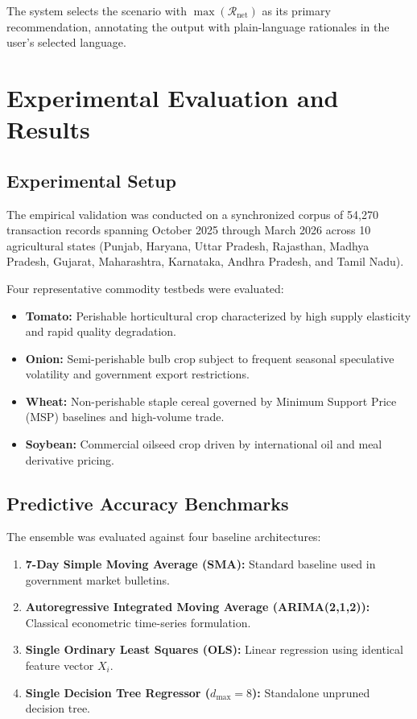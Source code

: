 \documentclass[conference]{IEEEtran}
\begin{document}
The system selects the scenario with $\max(\mathcal{R}_{\text{net}})$ as its primary recommendation, annotating the output with plain-language rationales in the user's selected language.

\section{Experimental Evaluation and Results}

\subsection{Experimental Setup}
The empirical validation was conducted on a synchronized corpus of 54,270 transaction records spanning October 2025 through March 2026 across 10 agricultural states (Punjab, Haryana, Uttar Pradesh, Rajasthan, Madhya Pradesh, Gujarat, Maharashtra, Karnataka, Andhra Pradesh, and Tamil Nadu). 

Four representative commodity testbeds were evaluated:
\begin{itemize}
    \item \textbf{Tomato:} Perishable horticultural crop characterized by high supply elasticity and rapid quality degradation.
    \item \textbf{Onion:} Semi-perishable bulb crop subject to frequent seasonal speculative volatility and government export restrictions.
    \item \textbf{Wheat:} Non-perishable staple cereal governed by Minimum Support Price (MSP) baselines and high-volume trade.
    \item \textbf{Soybean:} Commercial oilseed crop driven by international oil and meal derivative pricing.
\end{itemize}

\subsection{Predictive Accuracy Benchmarks}
The ensemble was evaluated against four baseline architectures:
\begin{enumerate}
    \item \textbf{7-Day Simple Moving Average (SMA):} Standard baseline used in government market bulletins.
    \item \textbf{Autoregressive Integrated Moving Average (ARIMA(2,1,2)):} Classical econometric time-series formulation.
    \item \textbf{Single Ordinary Least Squares (OLS):} Linear regression using identical feature vector $X_i$.
    \item \textbf{Single Decision Tree Regressor ($d_{\max}=8$):} Standalone unpruned decision tree.
\end{enumerate}
\end{document}
